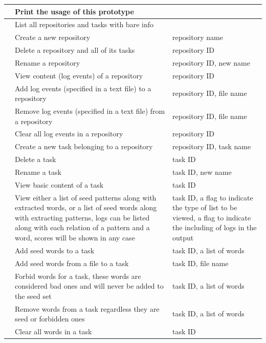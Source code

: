 \begin{footnotesize}
\begin{longtable}{|>{\raggedleft}p{}
			|>{\raggedright}p{}
			|>{\raggedright\arraybackslash}p{}|}
		\resetCounter
		\getCounter & Print the usage of this prototype & \\ \hline
		\getCounter & List all repositories and tasks with bare info & \\ \hline
		\getCounter & Create a new repository & repository name \\ \hline
		\getCounter & Delete a repository and all of its tasks & repository ID \\ \hline
		\getCounter & Rename a repository & repository ID, new name \\ \hline
		\getCounter & View content (log events) of a repository & repository ID \\ \hline
		\getCounter & Add log events (specified in a text file) to a repository & repository ID, file name \\ \hline
		\getCounter & Remove log events (specified in a text file) from a repository & repository ID, file name \\ \hline
		\getCounter & Clear all log events in a repository & repository ID \\ \hline
		\getCounter & Create a new task belonging to a repository & repository ID, task name \\ \hline
		\getCounter & Delete a task & task ID \\ \hline
		\getCounter & Rename a task & task ID, new name \\ \hline
		\getCounter & View basic content of a task & task ID \\ \hline
		\getCounter & View either a list of seed patterns along with extracted words, or a list of seed words along with extracting patterns, logs can be listed along with each relation of a pattern and a word, scores will be shown in any case & task ID, a flag to indicate the type of list to be viewed, a flag to indicate the including of logs in the output \\ \hline
		\getCounter & Add seed words to a task & task ID, a list of words \\ \hline
		\getCounter & Add seed words from a file to a task & task ID, file name \\ \hline
		\getCounter & Forbid words for a task, these words are considered bad ones and will never be added to the seed set & task ID, a list of words \\ \hline
		\getCounter & Remove words from a task regardless they are seed or forbidden ones & task ID, a list of words \\ \hline
		\getCounter & Clear all words in a task & task ID \\ \hline

\end{longtable}
\end{footnotesize}
